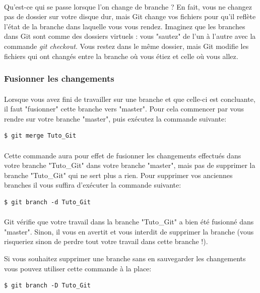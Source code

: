 \documentclass[french, a4paper, 12pt, titlepage]{article}
\begin{document}
\paragraph{}Qu’est-ce qui se passe lorsque l’on change de branche ? En fait, vous ne changez pas de dossier sur votre disque dur, mais Git change vos fichiers pour qu’il reflète l’état de la branche dans laquelle vous vous rendez. Imaginez que les branches dans Git sont comme des dossiers virtuels : vous "sautez" de l’un à l’autre avec la commande \emph{git checkout}. Vous restez dans le même dossier, mais Git modifie les fichiers qui ont changés entre la branche où vous étiez et celle où vous allez.

\subsubsection{Fusionner les changements}
\paragraph{}Lorsque vous avez fini de travailler sur une branche et que celle-ci est concluante, il faut "fusionner" cette branche vers "master". Pour cela commencer par vous rendre sur votre branche "master", puis exécutez la commande suivante:
\begin{lstlisting}
$ git merge Tuto_Git
\end{lstlisting}

\paragraph{}Cette commande aura pour effet de fusionner les changements effectués dans votre branche "Tuto\_Git" dans votre branche "master", mais pas de supprimer la branche "Tuto\_Git" qui ne sert plus a rien. Pour supprimer vos anciennes branches il vous suffira d'exécuter la commande suivante:
\begin{lstlisting}
$ git branch -d Tuto_Git
\end{lstlisting}

\paragraph{}Git vérifie que votre travail dans la branche "Tuto\_Git" a bien été fusionné dans "master". Sinon, il vous en avertit et vous interdit de supprimer la branche (vous risqueriez sinon de perdre tout votre travail dans cette branche !).

Si vous souhaitez supprimer une branche sans en sauvegarder les changements vous pouvez utiliser cette commande à la place:
\begin{lstlisting}
$ git branch -D Tuto_Git
\end{lstlisting}
\end{document}
